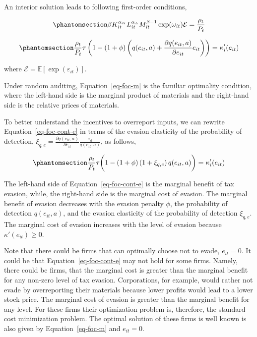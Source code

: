 \documentclass[
  12pt]{article}
\theoremstyle{definition}
\theoremstyle{remark}
\begin{document}
An interior solution leads to following first-order conditions,

\begin{equation}\phantomsection\label{eq-foc-m}{
\beta K_{it}^{\alpha_K}L_{it}^{\alpha_L}M_{it}^{\beta-1}\exp(\omega_{it})\mathcal{E}=\frac{\rho_{t}}{P_t}
}\end{equation}

\begin{equation}\phantomsection\label{eq-foc-cont-e}{
\frac{\rho_t}{P_t}\tau\left(1-(1+\phi)\left(q(e_{it}, a)+\frac{\partial q(e_{it}, a)}{\partial e_{it}} e_{it}\right)\right) =\kappa_i'(e_{it})
}\end{equation}

where \(\mathcal{E}=\mathbb{E}[\exp(\varepsilon_{it})]\).

Under random auditing, Equation~\ref{eq-foc-m} is the familiar
optimality condition, where the left-hand side is the marginal product
of materials and the right-hand side is the relative prices of
materials.

To better understand the incentives to overreport inputs, we can rewrite
Equation~\ref{eq-foc-cont-e} in terms of the evasion elasticity of the
probability of detection,
\(\xi_{q,e}=\frac{\partial q(e_{it}, a)}{\partial e_{it}}\frac{e_{it}}{q(e_{it}, a)}\),
as follows,

\begin{equation}\phantomsection\label{eq-foc-cont-e}{
\frac{\rho_t}{P_t}\tau\bigg(1-(1+\phi)\left(1+\xi_{q,e}\right)q(e_{it}, a)\bigg) =\kappa_i'(e_{it})
}\end{equation}

The left-hand side of Equation~\ref{eq-foc-cont-e} is the marginal
benefit of tax evasion, while, the right-hand side is the marginal cost
of evasion. The marginal benefit of evasion decreases with the evasion
penalty \(\phi\), the probability of detection \(q(e_{it}, a)\), and the
evasion elasticity of the probability of detection \(\xi_{q,e}\). The
marginal cost of evasion increases with the level of evasion because
\(\kappa'(e_{it})\ge0\).

Note that there could be firms that can optimally choose not to evade,
\(e_{it}=0\). It could be that Equation~\ref{eq-foc-cont-e} may not hold
for some firms. Namely, there could be firms, that the marginal cost is
greater than the marginal benefit for any non-zero level of tax evasion.
Corporations, for example, would rather not evade by overreporting their
materials because lower profits would lead to a lower stock price. The
marginal cost of evasion is greater than the marginal benefit for any
level. For these firms their optimization problem is, therefore, the
standard cost minimization problem. The optimal solution of these firms
is well known is also given by Equation~\ref{eq-foc-m} and \(e_{it}=0\).
\end{document}
